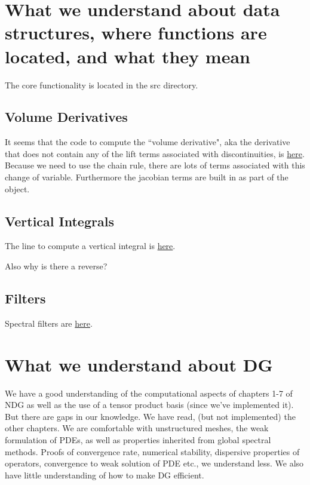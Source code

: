 \documentclass{article}
\begin{document}
\section{What we understand about data structures, where functions are located, and what they mean}
The core functionality is located in the src directory. 


\subsection{Volume Derivatives}
It seems that the code to compute the ``volume derivative", aka the derivative that does not contain any of the lift terms associated with discontinuities, is  \href{https://github.com/climate-machine/CLIMA/blob/2629ce8f5ff7eb53f4b1eea8bfb90de7e3c0a380/src/DGmethods/DGmodel_kernels.jl#L631}{here}.
Because we need to use the chain rule, there are lots of terms associated with this change of variable. Furthermore the jacobian terms are built in as part of the object. 



\subsection{Vertical Integrals}
The line to compute a vertical integral is \href{https://github.com/climate-machine/CLIMA/blob/2629ce8f5ff7eb53f4b1eea8bfb90de7e3c0a380/src/DGmethods/DGmodel_kernels.jl#L821}{here}. 

Also why is there a reverse?

\subsection{Filters}
Spectral filters are \href{https://github.com/climate-machine/CLIMA/blob/2629ce8f5ff7eb53f4b1eea8bfb90de7e3c0a380/src/DGmethods/DGmodel_kernels.jl#L968}{here}.


\section{What we understand about DG}

We have a good understanding of the computational aspects of chapters 1-7 of NDG as well as the use of a tensor product basis (since we've implemented it). But there are gaps in our knowledge.  We have read, (but not implemented) the other chapters. We are comfortable with unstructured meshes, the weak formulation of PDEs, as well as properties inherited from global spectral methods. Proofs of convergence rate, numerical stability, dispersive properties of operators, convergence to weak solution of PDE etc., we understand less. We also have little understanding of how to make DG efficient.
\end{document}

